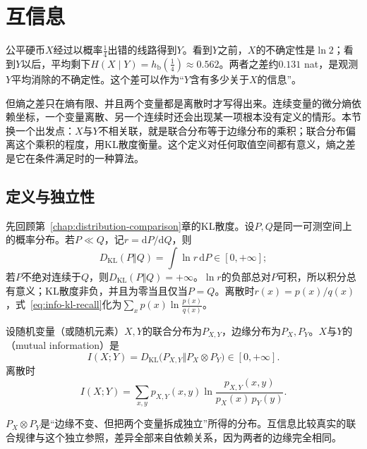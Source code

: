\section{互信息}
\label{sec:info-mutual-information}

公平硬币$X$经过以概率$\tfrac14$出错的线路得到$Y$。看到$Y$之前，$X$的不确定性是$\ln2$；看到$Y$以后，平均剩下$H(X\mid Y)=h_{\mathrm{b}}(\tfrac14)\approx0.562$。两者之差约$0.131$ nat，是观测$Y$平均消除的不确定性。这个差可以作为“$Y$含有多少关于$X$的信息”。

但熵之差只在熵有限、并且两个变量都是离散时才写得出来。连续变量的微分熵依赖坐标，一个变量离散、另一个连续时还会出现某一项根本没有定义的情形。本节换一个出发点：$X$与$Y$不相关联，就是联合分布等于边缘分布的乘积；联合分布偏离这个乘积的程度，用KL散度衡量。这个定义对任何取值空间都有意义，熵之差是它在条件满足时的一种算法。

\subsection{定义与独立性}
\label{sec:info-mi-definition}

先回顾第~\ref{chap:distribution-comparison}章的KL散度。设$P,Q$是同一可测空间上的概率分布。若$P\ll Q$，记$r=\mathrm{d}P/\mathrm{d}Q$，则
\begin{equation}
  D_{\mathrm{KL}}(P\Vert Q)=\int\ln r\,\mathrm{d}P\in[0,+\infty];
  \label{eq:info-kl-recall}
\end{equation}
若$P$不绝对连续于$Q$，则$D_{\mathrm{KL}}(P\Vert Q)=+\infty$。$\ln r$的负部总对$P$可积，所以积分总有意义；KL散度非负，并且为零当且仅当$P=Q$。离散时$r(x)=p(x)/q(x)$，式~\eqref{eq:info-kl-recall}化为$\sum_xp(x)\ln\frac{p(x)}{q(x)}$。

\begin{definition}[互信息]
\label{def:info-mutual-information}
设随机变量（或随机元素）$X,Y$的联合分布为$P_{X,Y}$，边缘分布为$P_X,P_Y$。$X$与$Y$的（mutual information）是
\begin{equation}
  I(X;Y)=D_{\mathrm{KL}}\bigl(P_{X,Y}\Vert P_X\otimes P_Y\bigr)\in[0,+\infty].
  \label{eq:info-mutual-information}
\end{equation}
离散时
\begin{equation}
  I(X;Y)=\sum_{x,y}p_{X,Y}(x,y)\ln\frac{p_{X,Y}(x,y)}{p_X(x)\,p_Y(y)}.
  \label{eq:info-mutual-information-discrete}
\end{equation}
\end{definition}

$P_X\otimes P_Y$是“边缘不变、但把两个变量拆成独立”所得的分布。互信息比较真实的联合规律与这个独立参照，差异全部来自依赖关系，因为两者的边缘完全相同。


